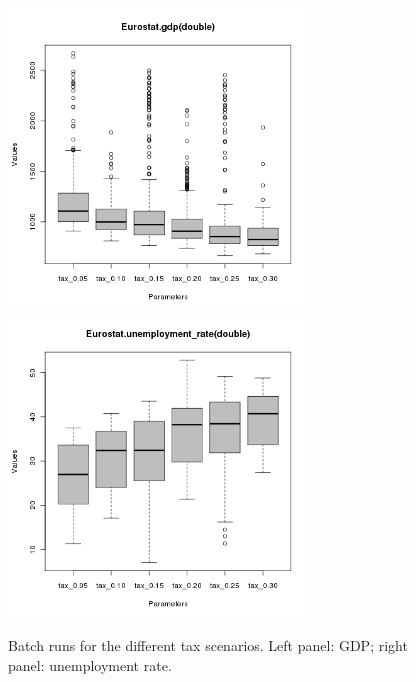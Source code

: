 
\begin{figure}[ht!]
\centering\leavevmode
\begin{minipage}{17cm}
\centering\leavevmode
\includegraphics[width=8cm]{./batch/Eurostat-gdp-scenarios.png}
\includegraphics[width=8cm]{./batch/Eurostat-unemployment_rate-scenarios.png}
\end{minipage}
\caption{Batch runs for the different tax scenarios. Left panel: GDP; right panel: unemployment rate.}
\label{Figure: scenarios}
\end{figure}

